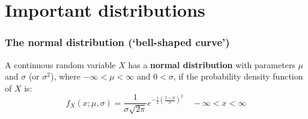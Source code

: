 \documentclass[9pt]{beamer}
\begin{document}
\section{Important distributions}

\begin{frame}
\frametitle{The normal distribution (`bell-shaped curve')}

\begin{definition}
A continuous random variable $X$ has a \textbf{normal distribution} with parameters $\mu$ and $\sigma$ (or $\sigma^2$), where $-\infty < \mu < \infty$ and $0 < \sigma$, if the probability density function of $X$ is:
\begin{equation*}
f_X(x; \mu, \sigma) = \frac{1}{\sigma\sqrt{2 \pi}} e^{-\frac{1}{2}(\frac{x-\mu}{\sigma})^2} \quad -\infty < x < \infty
\end{equation*}
\end{definition}




\end{frame}
\end{document}
